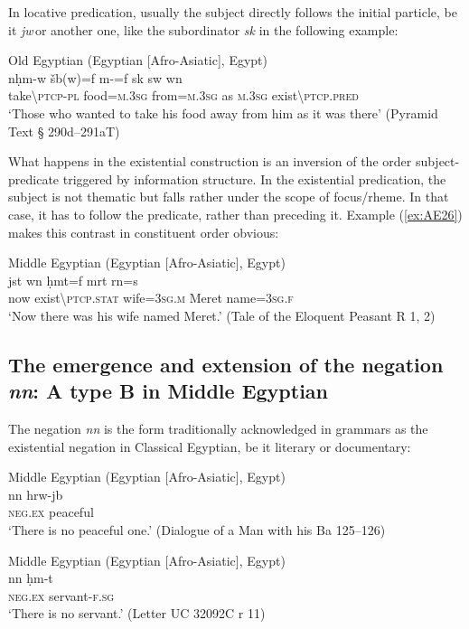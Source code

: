 \documentclass[output=paper,draft,draftmode,colorlinks,citecolor=brown]{langscibook}
\begin{document}
In locative predication, usually the subject directly follows the initial particle, be it \textit{jw} or another one, like the subordinator \textit{sk} in the following example:  

\ea Old Egyptian (Egyptian [Afro-Asiatic], Egypt) \label{ex:AE25}\\
    \gll nḥm-w šb(w)=f m-{\ꜥ}=f sk sw wn\\
    take\textbackslash\textsc{ptcp-pl} food=\textsc{m.3sg} from=\textsc{m.3sg} as \textsc{m.3sg} exist\textbackslash\textsc{ptcp.pred}\\ 
    \glt ‘Those who wanted to take his food away from him as it was there’ (Pyramid Text § 290d–291aT) 
\z 
 
What happens in the existential construction is an inversion of the order sub\-ject-predicate triggered by information structure. In the existential predication, the subject is not thematic but falls rather under the scope of focus/rheme. In that case, it has to follow the predicate, rather than preceding it. Example (\ref{ex:AE26}) makes this contrast in constituent order obvious:
 
\ea Middle Egyptian (Egyptian [Afro-Asiatic], Egypt) \label{ex:AE26}\\
    \gll jst wn ḥmt=f mrt rn=s\\
    now exist\textbackslash\textsc{ptcp.stat} wife=\textsc{3sg.m} Meret name=\textsc{3sg.f}\\  
    \glt ‘Now there was his wife named Meret.’ (Tale of the Eloquent Peasant R 1, 2) 
\z 


\subsection{The emergence and extension of the negation \textit{nn}: A type B in Middle Egyptian}\label{s:AE2-3}

The negation \textit{nn} is the form traditionally acknowledged in grammars as the existential negation in Classical Egyptian, be it literary or documentary: 
 
\ea Middle Egyptian (Egyptian [Afro-Asiatic], Egypt) \label{ex:AE27}\\
    \gll nn hrw-jb\\  
    \textsc{neg.ex} peaceful\\ 
    \glt ‘There is no peaceful one.’ (Dialogue of a Man with his Ba 125–126)
\z 
 
\ea Middle Egyptian (Egyptian [Afro-Asiatic], Egypt) \label{ex:AE28}\\
    \gll nn ḥm-t \\
    \textsc{neg.ex} servant-\textsc{f.sg}\\ 
    \glt ‘There is no servant.’ (Letter UC 32092C r 11)
\z 
\end{document}
